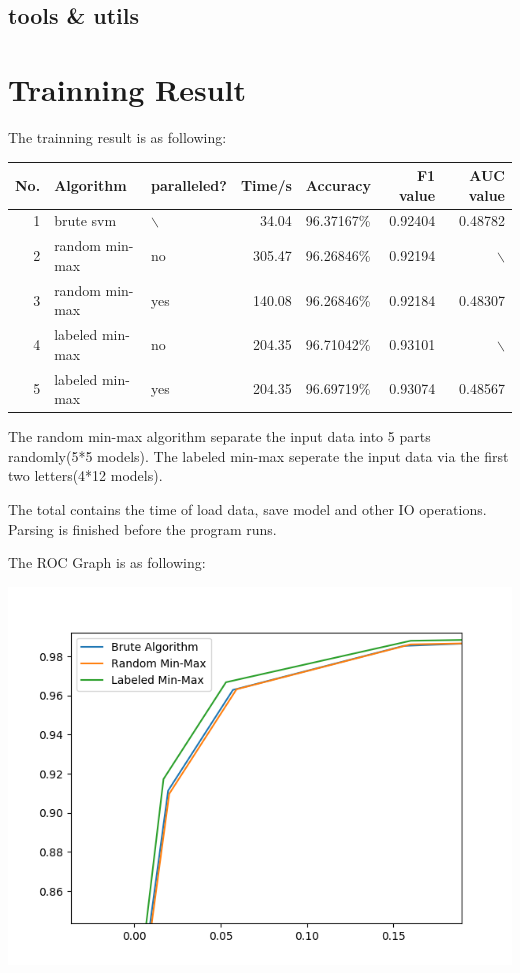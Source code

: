 \documentclass[11pt]{article}
\begin{document}
\subsection{tools \& utils}
\label{sec-1-3}

\section{Trainning Result}
\label{sec-2}
The trainning result is as following:
\begin{center}
\begin{tabular}{rllrlrr}
\hline
No. & Algorithm & paralleled? & Time/s & Accuracy & F1 value & AUC value\\
\hline
1 & brute svm & $\backslash$ & 34.04 & 96.37167\% & 0.92404 & 0.48782\\
2 & random min-max & no & 305.47 & 96.26846\% & 0.92194 & $\backslash$\\
3 & random min-max & yes & 140.08 & 96.26846\% & 0.92184 & 0.48307\\
4 & labeled min-max & no & 204.35 & 96.71042\% & 0.93101 & $\backslash$\\
5 & labeled min-max & yes & 204.35 & 96.69719\% & 0.93074 & 0.48567\\
\hline
\end{tabular}
\end{center}
The random min-max algorithm separate the input data into 5 parts randomly(5*5 models).
The labeled min-max seperate the input data via the first two letters(4*12 models).

The total contains the time of load data, save model and other IO operations.
Parsing is finished before the program runs.

The ROC Graph is as following:


\includegraphics[width=.9\linewidth]{figure_1.png}
\end{document}
